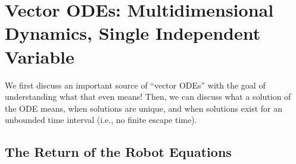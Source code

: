 





\section{Vector ODEs: Multidimensional Dynamics, Single Independent Variable}

We first discuss an important source of ``vector ODEs'' with the goal of understanding what that even means! Then, we can discuss what a solution of the ODE means, when solutions are unique, and when solutions exist for an unbounded time interval (i.e., no finite escape time). 

\subsection{The Return of the Robot Equations}

